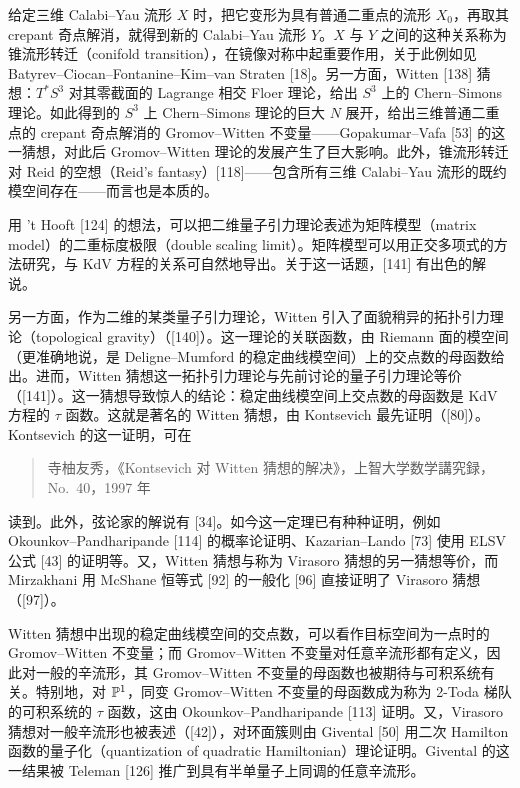 给定三维 Calabi–Yau 流形 $X$ 时，把它变形为具有普通二重点的流形 $X_0$，再取其 crepant 奇点解消，就得到新的 Calabi–Yau 流形 $Y$。$X$ 与 $Y$ 之间的这种关系称为锥流形转迁（conifold transition），在镜像对称中起重要作用，关于此例如见 Batyrev–Ciocan–Fontanine–Kim–van Straten [18]。另一方面，Witten [138] 猜想：$T^*S^3$ 对其零截面的 Lagrange 相交 Floer 理论，给出 $S^3$ 上的 Chern–Simons 理论。如此得到的 $S^3$ 上 Chern–Simons 理论的巨大 $N$ 展开，给出三维普通二重点的 crepant 奇点解消的 Gromov–Witten 不变量——Gopakumar–Vafa [53] 的这一猜想，对此后 Gromov–Witten 理论的发展产生了巨大影响。此外，锥流形转迁对 Reid 的空想（Reid's fantasy）[118]——包含所有三维 Calabi–Yau 流形的既约模空间存在——而言也是本质的。

用 't Hooft [124] 的想法，可以把二维量子引力理论表述为矩阵模型（matrix model）的二重标度极限（double scaling limit）。矩阵模型可以用正交多项式的方法研究，与 KdV 方程的关系可自然地导出。关于这一话题，[141] 有出色的解说。

另一方面，作为二维的某类量子引力理论，Witten 引入了面貌稍异的拓扑引力理论（topological gravity）（[140]）。这一理论的关联函数，由 Riemann 面的模空间（更准确地说，是 Deligne–Mumford 的稳定曲线模空间）上的交点数的母函数给出。进而，Witten 猜想这一拓扑引力理论与先前讨论的量子引力理论等价（[141]）。这一猜想导致惊人的结论：稳定曲线模空间上交点数的母函数是 KdV 方程的 $\tau$ 函数。这就是著名的 Witten 猜想，由 Kontsevich 最先证明（[80]）。Kontsevich 的这一证明，可在
\begin{quote}
\noindent [寺柚 97] 寺柚友秀，《Kontsevich 对 Witten 猜想的解决》，上智大学数学講究録，No.\ 40，1997 年
\end{quote}
读到。此外，弦论家的解说有 [34]。如今这一定理已有种种证明，例如 Okounkov–Pandharipande [114] 的概率论证明、Kazarian–Lando [73] 使用 ELSV 公式 [43] 的证明等。又，Witten 猜想与称为 Virasoro 猜想的另一猜想等价，而 Mirzakhani 用 McShane 恒等式 [92] 的一般化 [96] 直接证明了 Virasoro 猜想（[97]）。

Witten 猜想中出现的稳定曲线模空间的交点数，可以看作目标空间为一点时的 Gromov–Witten 不变量；而 Gromov–Witten 不变量对任意辛流形都有定义，因此对一般的辛流形，其 Gromov–Witten 不变量的母函数也被期待与可积系统有关。特别地，对 $\mathbb{P}^1$，同变 Gromov–Witten 不变量的母函数成为称为 2-Toda 梯队的可积系统的 $\tau$ 函数，这由 Okounkov–Pandharipande [113] 证明。又，Virasoro 猜想对一般辛流形也被表述（[42]），对环面簇则由 Givental [50] 用二次 Hamilton 函数的量子化（quantization of quadratic Hamiltonian）理论证明。Givental 的这一结果被 Teleman [126] 推广到具有半单量子上同调的任意辛流形。

